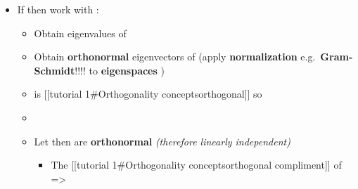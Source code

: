 \begin{itemize}
        \begin{itemize}

          \item
                If  then work with
                :

                \begin{itemize}

                  \item
                        Obtain eigenvalues
                         of
                  \item
                        Obtain \textbf{orthonormal} eigenvectors
                         of
                         (apply \textbf{normalization}
                        e.g.~\textbf{Gram-Schmidt}!!!! to \textbf{eigenspaces}
                        )
                  \item
                        is {[}{[}tutorial 1\#Orthogonality
                        concepts\textbar orthogonal{]}{]} so 
                  \item
                  \item
                        Let
                        then
                         are
                        \textbf{orthonormal} \emph{(therefore linearly independent)}

                        \begin{itemize}

                          \item
                                The {[}{[}tutorial 1\#Orthogonality concepts\textbar orthogonal
                                compliment{]}{]} of
                                =\textgreater{}


\end{itemize}
\end{itemize}
\end{itemize}
\end{itemize}
